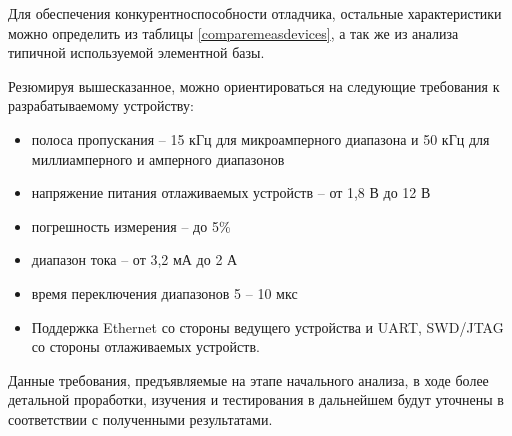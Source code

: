 Для обеспечения конкурентноспособности отладчика, остальные характеристики можно определить 
из таблицы \ref{comparemeasdevices}, а так же из анализа типичной используемой элементной базы.

Резюмируя вышесказанное, можно ориентироваться на следующие требования к разрабатываемому 
устройству:
\begin{itemize}
    \item полоса пропускания -- 15 кГц для микроамперного диапазона и 50 кГц для миллиамперного и 
    амперного диапазонов
    \item напряжение питания отлаживаемых устройств -- от 1,8 В до 12 В
    \item погрешность измерения -- до 5\%
    \item диапазон тока -- от 3,2 мА до 2 А
    \item время переключения диапазонов 5 -- 10 мкс
    \item Поддержка Ethernet со стороны ведущего устройства и UART, SWD/JTAG со стороны отлаживаемых
    устройств.
\end{itemize}

Данные требования, предъявляемые на этапе начального анализа, в ходе более детальной проработки,
изучения и тестирования в дальнейшем будут уточнены в соответствии с полученными результатами.
